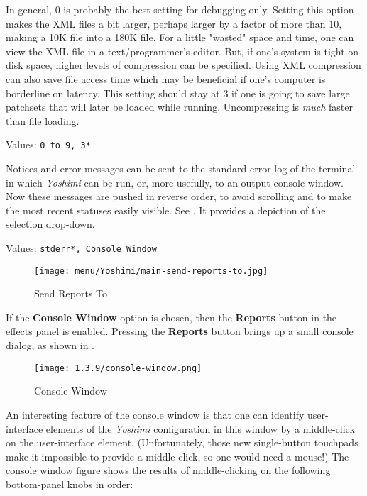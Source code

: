    In general, 0 is probably the best setting for debugging only.  Setting this
   option makes the XML files a bit larger, perhaps larger by a factor of more
   than 10, making a 10K file into a 180K file.  For a little "wasted" space
   and time, one can view the XML file in a text/programmer's editor.  But, if
   one's system is tight on disk space, higher levels of compression can be
   specified.  Using XML compression can also save file access time which may
   be beneficial if one's computer is borderline on latency.  This setting
   should stay at 3 if one is going to save large patchsets that will later be
   loaded while running. Uncompressing is \textsl{much} faster than file
   loading.

   Values: \texttt{0 to 9, 3*}

   Notices and error messages can be sent to the standard error log of
   the terminal in which 
   \textsl{Yoshimi} can be run, or, more usefully, to
   an output console window.
   Now these messages are pushed in reverse order, to avoid scrolling
   and to make the most recent statuses easily visible.
   See .
   It provides a depiction of the selection drop-down.

   Values: \texttt{stderr*, Console Window}

\begin{figure}[H]
   \centering 
   \texttt{[image: menu/Yoshimi/main-send-reports-to.jpg]}
   \caption[Send Reports]{Send Reports To}
   \label{fig:send_reports_to}
\end{figure}

   If the \textbf{Console Window} option is chosen, then the
   \textbf{Reports} button in the effects panel is enabled.
   Pressing the \textbf{Reports} button brings up a small console dialog, as
   shown in .

\begin{figure}[H]
   \centering 
   \texttt{[image: 1.3.9/console-window.png]}
   \caption[Yoshimi Console Window]{Console Window}
   \label{fig:console_window}
\end{figure}

   An interesting feature of the console window is that one can identify
   user-interface elements of the \textsl{Yoshimi} configuration in this window
   by a middle-click on the user-interface element.
   (Unfortunately, those new single-button touchpads make it impossible to
   provide a middle-click, so one would need a mouse!)
   The console window figure shows the results of middle-clicking on the
   following bottom-panel knobs in order:

